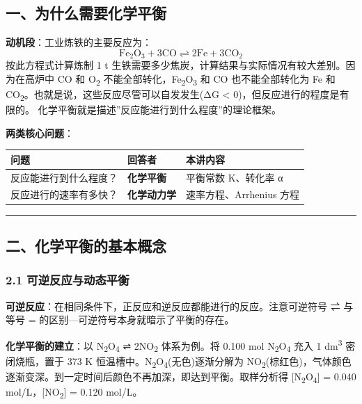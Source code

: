 \subsection{一、为什么需要化学平衡}\label{ux4e00ux4e3aux4ec0ux4e48ux9700ux8981ux5316ux5b66ux5e73ux8861}

\textbf{动机段}：工业炼铁的主要反应为：
\[\mathrm{Fe_2O_3 + 3CO \rightleftharpoons 2Fe + 3CO_2}\]
按此方程式计算炼制 1 t 生铁需要多少焦炭，计算结果与实际情况有较大差别。因为在高炉中 CO 和 O\textsubscript{2} 不能全部转化，Fe\textsubscript{2}O\textsubscript{3} 和 CO 也不能全部转化为 Fe 和 CO\textsubscript{2}。也就是说，这些反应尽管可以自发发生(ΔG \textless{} 0)，但反应进行的程度是有限的。
化学平衡就是描述''反应能进行到什么程度''的理论框架。

\textbf{两类核心问题}：

{\def\LTcaptype{none} %
\begin{longtable}[]{@{}lll@{}}
\toprule\noalign{}
问题 & 回答者 & 本讲内容 \\
\midrule\noalign{}
\endhead
\bottomrule\noalign{}
\endlastfoot
反应能进行到什么程度？ & \textbf{化学平衡} & 平衡常数 K、转化率 α \\
反应进行的速率有多快？ & \textbf{化学动力学} & 速率方程、Arrhenius 方程 \\
\end{longtable}
}

\begin{center}\rule{0.5\linewidth}{0.5pt}\end{center}

\subsection{二、化学平衡的基本概念}\label{ux4e8cux5316ux5b66ux5e73ux8861ux7684ux57faux672cux6982ux5ff5}

\subsubsection{2.1 可逆反应与动态平衡}\label{ux53efux9006ux53cdux5e94ux4e0eux52a8ux6001ux5e73ux8861}

\textbf{可逆反应}：在相同条件下，正反应和逆反应都能进行的反应。注意可逆符号 ⇌ 与等号 = 的区别---可逆符号本身就暗示了平衡的存在。

\textbf{化学平衡的建立}：以 N\textsubscript{2}O\textsubscript{4} ⇌ 2NO\textsubscript{2} 体系为例。将 0.100 mol N\textsubscript{2}O\textsubscript{4} 充入 1 dm\textsuperscript{3} 密闭烧瓶，置于 373 K 恒温槽中。N\textsubscript{2}O\textsubscript{4}(无色)逐渐分解为 NO\textsubscript{2}(棕红色)，气体颜色逐渐变深。到一定时间后颜色不再加深，即达到平衡。取样分析得 {[}N\textsubscript{2}O\textsubscript{4}{]} = 0.040 mol/L，{[}NO\textsubscript{2}{]} = 0.120 mol/L。

